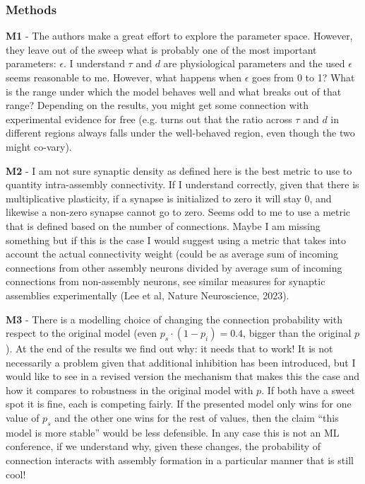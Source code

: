 \documentclass[a4paper, 11pt]{article}
\begin{document}
\subsubsection*{Methods}
\textbf{M1} - The authors make a great effort to explore the parameter space. However, they leave out of the sweep what is probably one of the most important parameters: $\epsilon$. I understand $\tau$ and $d$ are physiological parameters and the used $\epsilon$ seems reasonable to me. However, what happens when $\epsilon$ goes from 0 to 1? What is the range under which the model behaves well and what breaks out of that range? Depending on the results, you might get some connection with experimental evidence for free (e.g. turns out that the ratio across $\tau$ and $d$ in different regions always falls under the well-behaved region, even though the two might co-vary).

\textbf{M2} - I am not sure synaptic density as defined here is the best metric to use to quantity intra-assembly connectivity. If I understand correctly, given that there is multiplicative plasticity, if a synapse is initialized to zero it will stay 0, and likewise a non-zero synapse cannot go to zero. Seems odd to me to use a metric that is defined based on the number of connections. Maybe I am missing something but if this is the case I would suggest using a metric that takes into account the actual connectivity weight (could be as average sum of incoming connections from other assembly neurons divided by average sum of incoming connections from non-assembly neurons, see similar measures for synaptic assemblies experimentally (Lee et al, Nature Neuroscience, 2023).

\textbf{M3} - There is a modelling choice of changing the connection probability with respect to the original model (even $p_s \cdot (1 - p_i) = 0.4$, bigger than the original $p$). At the end of the results we find out why: it needs that to work! It is not necessarily a problem given that additional inhibition has been introduced, but I would like to see in a revised version the mechanism that makes this the case and how it compares to robustness in the original model with $p$. If both have a sweet spot it is fine, each is competing fairly. If the presented model only wins for one value of $p_s$ and the other one wins for the rest of values, then the claim ``this model is more stable'' would be less defensible. In any case this is not an ML conference, if we understand why, given these changes, the probability of connection interacts with assembly formation in a particular manner that is still cool!
\end{document}
